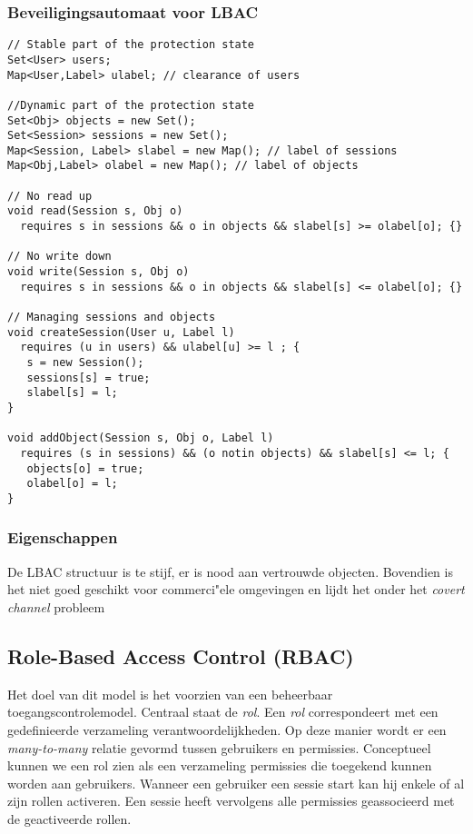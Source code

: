 \documentclass[../main.tex]{subfiles}
\begin{document}
\subsubsection{Beveiligingsautomaat voor LBAC}
\begin{lstlisting}[caption=LBAC Automaat]
// Stable part of the protection state
Set<User> users;
Map<User,Label> ulabel; // clearance of users

//Dynamic part of the protection state
Set<Obj> objects = new Set();
Set<Session> sessions = new Set();
Map<Session, Label> slabel = new Map(); // label of sessions
Map<Obj,Label> olabel = new Map(); // label of objects

// No read up
void read(Session s, Obj o)
  requires s in sessions && o in objects && slabel[s] >= olabel[o]; {}

// No write down
void write(Session s, Obj o)
  requires s in sessions && o in objects && slabel[s] <= olabel[o]; {}
  
// Managing sessions and objects
void createSession(User u, Label l)
  requires (u in users) && ulabel[u] >= l ; {
   s = new Session();
   sessions[s] = true;
   slabel[s] = l;
}

void addObject(Session s, Obj o, Label l)
  requires (s in sessions) && (o notin objects) && slabel[s] <= l; {
   objects[o] = true;
   olabel[o] = l;
}
\end{lstlisting}

\subsubsection{Eigenschappen}
De LBAC structuur is te stijf, er is nood aan vertrouwde objecten. Bovendien is het niet goed geschikt voor commerci"ele omgevingen en lijdt het onder het \textit{covert channel} probleem

\subsection{Role-Based Access Control (RBAC)}
Het doel van dit model is het voorzien van een beheerbaar toegangscontrolemodel. Centraal staat de \textit{rol}. Een \textit{rol} correspondeert met een gedefinieerde verzameling verantwoordelijkheden. Op deze manier wordt er een \textit{many-to-many} relatie gevormd tussen gebruikers en permissies. Conceptueel kunnen we een rol zien als een verzameling permissies die toegekend kunnen worden aan gebruikers. Wanneer een gebruiker een sessie start kan hij enkele of al zijn rollen activeren. Een sessie heeft vervolgens alle permissies geassocieerd met de geactiveerde rollen.
\end{document}
